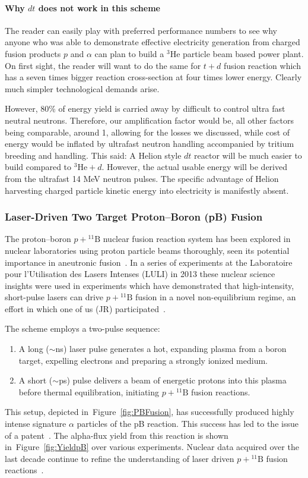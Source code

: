 \documentclass[particles,article,accept,pdftex,moreauthors]{Definitions/mdpi}
\newcommand{\rf}[1]{Figure~\ref{#1}}
\begin{document}
\paragraph*{\bf Why $dt$ does not work in this scheme}
The reader can easily play with preferred performance numbers to see why anyone who was able to demonstrate effective electricity generation from charged fusion products $p$ and $\alpha$ can plan to build a ${}^3\mathrm{He}$ particle beam based power plant. On first sight, the reader will want to do the same for $t+d$ fusion reaction which has a seven times bigger reaction cross-section at four times lower energy. Clearly much simpler technological demands arise.

However, 80\% of energy yield is carried away by difficult to control ultra fast neutral neutrons. Therefore, our amplification factor would be, all other factors being comparable, around 1, allowing for the losses we discussed, while cost of energy would be inflated by ultrafast neutron handling accompanied by tritium breeding and handling. This said: A Helion style $dt$ reactor will be much easier to build compared to ${}^3\mathrm{He}+d$. However, the actual usable energy will be derived from the ultrafast 14 MeV neutron pulses. The specific advantage of Helion harvesting charged particle kinetic energy into electricity is manifestly absent.

\subsubsection{Laser-Driven Two Target Proton--Boron (pB) Fusion}\label{sssec:LULIpB}
The proton--boron $p+{}^{11}\mathrm{B}$ nuclear fusion reaction system has been explored in nuclear laboratories using proton particle beams thoroughly, seen its potential importance in aneutronic fusion~\cite{Stave:2011zz,Sikora:2016pB}. In a series of experiments at the Laboratoire pour l'Utilisation des Lasers Intenses (LULI) in 2013 these nuclear science insights were used in experiments which have demonstrated that high-intensity, short-pulse lasers can drive $p+{}^{11}\mathrm{B}$ fusion in a novel non-equilibrium regime, an effort in which one of us (JR) participated~\cite{Labaune:2013dla}.

The scheme employs a two-pulse sequence:
\begin{enumerate}[nosep]
\item A long ($\sim$ns) laser pulse generates a hot, expanding plasma from a boron target, expelling electrons and preparing a strongly ionized medium.
\item A short ($\sim$ps) pulse delivers a beam of energetic protons into this plasma before thermal equilibration, initiating $p+{}^{11}\mathrm{B}$ fusion reactions.
\end{enumerate}
This setup, depicted in~\rf{fig:PBFusion}, has successfully produced highly intense signature $\alpha$ particles of the pB reaction. This success has led to the issue of a patent~\cite{labaune2014production}. The alpha-flux yield from this reaction is shown in~\rf{fig:YieldpB} over various experiments. Nuclear data acquired over the last decade continue to refine the understanding of laser driven $p+{}^{11}\mathrm{B}$ fusion reactions~\cite{sciscio2025laser}.
\end{document}
